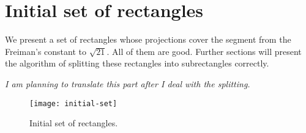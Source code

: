 \section{Initial set of rectangles}

We present a set of rectangles
whose projections cover the segment from the Freiman's constant to $\sqrt{21}$.
All of them are good.
Further sections will present the algorithm of splitting these rectangles into subrectangles correctly.

\textit{
	I am planning to translate this part
	after I deal with the splitting.
}

\begin{figure}[H]
	\centering
	\texttt{[image: initial-set]}
	\caption{Initial set of rectangles.}
	\label{initial-set}
\end{figure}
